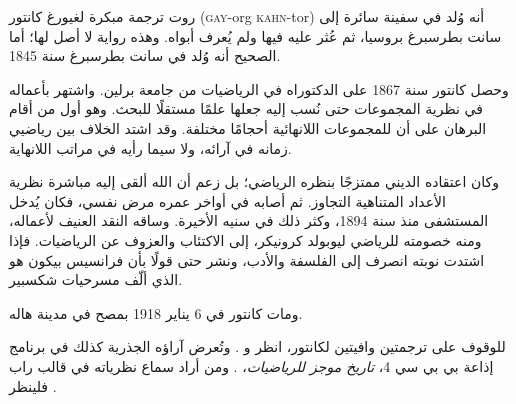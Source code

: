 \documentclass[../../../include/open-logic-section]{subfiles}
\begin{document}



روت ترجمة مبكرة لغيورغ كانتور (\textsc{gay}-org
\textsc{kahn}-tor) أنه وُلد في سفينة سائرة إلى سانت بطرسبرغ بروسيا،
ثم عُثر عليه فيها ولم يُعرف أبواه. وهذه رواية لا أصل لها؛ أما الصحيح
أنه وُلد في سانت بطرسبرغ سنة 1845.

وحصل كانتور سنة 1867 على الدكتوراه في الرياضيات من جامعة برلين. واشتهر
بأعماله في نظرية المجموعات حتى نُسب إليه جعلها علمًا مستقلًا للبحث. وهو
أول من أقام البرهان على أن للمجموعات اللانهائية أحجامًا مختلفة. وقد
اشتد الخلاف بين رياضيي زمانه في آرائه، ولا سيما رأيه في مراتب اللانهاية.

وكان اعتقاده الديني ممتزجًا بنظره الرياضي؛ بل زعم أن الله ألقى إليه
مباشرة نظرية الأعداد المتناهية التجاوز. ثم أصابه في أواخر عمره مرض
نفسي، فكان يُدخل المستشفى منذ سنة 1894، وكثر ذلك في سنيه الأخيرة.
وساقه النقد العنيف لأعماله، ومنه خصومته للرياضي ليوبولد كرونيكر، إلى
الاكتئاب والعزوف عن الرياضيات. فإذا اشتدت نوبته انصرف إلى الفلسفة
والأدب، ونشر حتى قولًا بأن فرانسيس بيكون هو الذي ألّف مسرحيات شكسبير.

ومات كانتور في 6 يناير 1918 بمصح في مدينة هاله.

\begin{reading}
للوقوف على ترجمتين وافيتين لكانتور، انظر \citet{Dauben1990} و
\citet{Grattan-Guinness1971}. وتُعرض آراؤه الجذرية كذلك في برنامج
إذاعة بي بي سي 4، \emph{تاريخ موجز للرياضيات}، \citep{Sautoy2014}.
ومن أراد سماع نظرياته في قالب راب فلينظر \citet{Rose2012}.
\end{reading}
\end{document}
